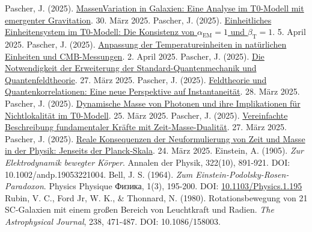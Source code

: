 \documentclass[12pt,a4paper]{article}
\newcommand{\betaT}{\beta_{\text{T}}}
\newcommand{\alphaEM}{\alpha_{\text{EM}}}
\begin{document}
\begin{thebibliography}{99}
		 Pascher, J. (2025). \href{https://github.com/jpascher/T0-Time-Mass-Duality/tree/main/2/pdf/Deutsch/MassVarGalaxien.pdf}{MassenVariation in Galaxien: Eine Analyse im T0-Modell mit emergenter Gravitation}. 30. März 2025.
		 Pascher, J. (2025). \href{https://github.com/jpascher/T0-Time-Mass-Duality/tree/main/2/pdf/Deutsch/Alpha1Beta1Konsistenz.pdf}{Einheitliches Einheitensystem im T0-Modell: Die Konsistenz von \(\alphaEM = 1\) und \(\betaT = 1\)}. 5. April 2025.
		 Pascher, J. (2025). \href{https://github.com/jpascher/T0-Time-Mass-Duality/tree/main/2/pdf/Deutsch/TempEinheitenCMB.pdf}{Anpassung der Temperatureinheiten in natürlichen Einheiten und CMB-Messungen}. 2. April 2025.
		 Pascher, J. (2025). \href{https://github.com/jpascher/T0-Time-Mass-Duality/tree/main/2/pdf/Deutsch/NotwendigkeitQMErweiterung.pdf}{Die Notwendigkeit der Erweiterung der Standard-Quantenmechanik und Quantenfeldtheorie}. 27. März 2025.
		 Pascher, J. (2025). \href{https://github.com/jpascher/T0-Time-Mass-Duality/tree/main/2/pdf/Deutsch/FeldtheorieQuanten.pdf}{Feldtheorie und Quantenkorrelationen: Eine neue Perspektive auf Instantaneität}. 28. März 2025.
		 Pascher, J. (2025). \href{https://github.com/jpascher/T0-Time-Mass-Duality/tree/main/2/pdf/Deutsch/DynMassePhotonenNichtlokal.pdf}{Dynamische Masse von Photonen und ihre Implikationen für Nichtlokalität im T0-Modell}. 25. März 2025.
		 Pascher, J. (2025). \href{https://github.com/jpascher/T0-Time-Mass-Duality/tree/main/2/pdf/Deutsch/VierKraefteZeitMasse.pdf}{Vereinfachte Beschreibung fundamentaler Kräfte mit Zeit-Masse-Dualität}. 27. März 2025.
		 Pascher, J. (2025). \href{https://github.com/jpascher/T0-Time-Mass-Duality/tree/main/2/pdf/Deutsch/JenseitsPlanck.pdf}{Reale Konsequenzen der Neuformulierung von Zeit und Masse in der Physik: Jenseits der Planck-Skala}. 24. März 2025.
		 Einstein, A. (1905). \textit{Zur Elektrodynamik bewegter Körper}. Annalen der Physik, 322(10), 891-921. DOI: 10.1002/andp.19053221004.
		 Bell, J. S. (1964). \textit{Zum Einstein-Podolsky-Rosen-Paradoxon}. Physics Physique {\selectfont Физика}, 1(3), 195-200. DOI: \href{https://doi.org/10.1103/Physics.1.195}{10.1103/Physics.1.195}
		 Rubin, V. C., Ford Jr, W. K., \& Thonnard, N. (1980). Rotationsbewegung von 21 SC-Galaxien mit einem großen Bereich von Leuchtkraft und Radien. \textit{The Astrophysical Journal}, 238, 471-487. DOI: 10.1086/158003.

\end{thebibliography}
\end{document}

